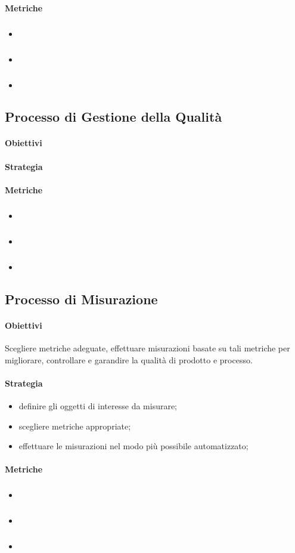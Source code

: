 		\paragraph{Metriche}
			\subparagraph{} 
			\begin{itemize}
				\item \textbf{}
				\item \textbf{}
				\item \textbf{}
			\end{itemize}
	\subsection{Processo di Gestione della Qualità}
		\paragraph{Obiettivi}
		\paragraph{Strategia}
		\paragraph{Metriche}
			\subparagraph{} 
			\begin{itemize}
				\item \textbf{}
				\item \textbf{}
				\item \textbf{}
			\end{itemize}
	\subsection{Processo di Misurazione} %
		\paragraph{Obiettivi}
		Scegliere metriche adeguate, effettuare misurazioni basate su tali metriche per migliorare, controllare e garandire la qualità di prodotto e processo.
		\paragraph{Strategia}
		\begin{itemize}
			\item definire gli oggetti di interesse da misurare;
			\item scegliere metriche appropriate;
			\item effettuare le misurazioni nel modo più possibile automatizzato;
		\end{itemize}
		\paragraph{Metriche}
			\subparagraph{} 
			\begin{itemize}
				\item \textbf{}
				\item \textbf{}
				\item \textbf{}
			\end{itemize}
		
